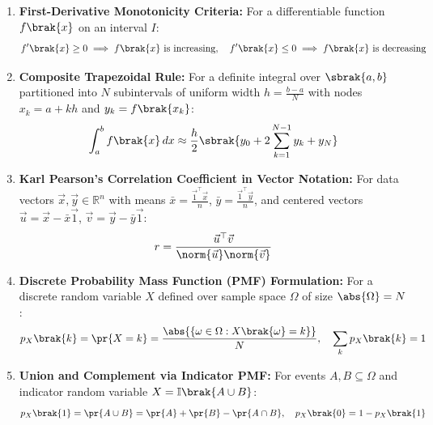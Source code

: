 \begin{enumerate}[label=\thesubsection.\arabic*, ref=\thesubsection.\theenumi]
	\item \textbf{First-Derivative Monotonicity Criteria:}
	For a differentiable function $f\brak{x}$ on an interval $I$:
	\begin{align}
		f'\brak{x} \ge 0 \implies f\brak{x} \text{ is increasing}, \quad f'\brak{x} \le 0 \implies f\brak{x} \text{ is decreasing} \label{eq:monotonicity_cond}
	\end{align}
	
	\item \textbf{Composite Trapezoidal Rule:}
	For a definite integral over $\sbrak{a, b}$ partitioned into $N$ subintervals of uniform width $h = \frac{b - a}{N}$ with nodes $x_k = a + kh$ and $y_k = f\brak{x_k}$:
	\begin{align}
		\int_{a}^{b} f\brak{x}\,dx \approx \frac{h}{2}\sbrak{y_0 + 2\sum_{k=1}^{N-1} y_k + y_N} \label{eq:trapezoidal_rule}
	\end{align}
	
	\item \textbf{Karl Pearson's Correlation Coefficient in Vector Notation:}
	For data vectors $\vec{x}, \vec{y} \in \mathbb{R}^n$ with means $\bar{x} = \frac{\vec{1}^{\top}\vec{x}}{n}$, $\bar{y} = \frac{\vec{1}^{\top}\vec{y}}{n}$, and centered vectors $\vec{u} = \vec{x} - \bar{x}\vec{1}$, $\vec{v} = \vec{y} - \bar{y}\vec{1}$:
	\begin{align}
		r = \frac{\vec{u}^{\top}\vec{v}}{\norm{\vec{u}}\norm{\vec{v}}} \label{eq:karl_pearson_vec}
	\end{align}
	
	\item \textbf{Discrete Probability Mass Function (PMF) Formulation:}
	For a discrete random variable $X$ defined over sample space $\Omega$ of size $\abs{\Omega} = N$:
	\begin{align}
		p_X\brak{k} = \pr{X = k} = \frac{\abs{\{\omega \in \Omega : X\brak{\omega} = k\}}}{N}, \quad \sum_{k} p_X\brak{k} = 1 \label{eq:pmf_prob_def}
	\end{align}
	
	\item \textbf{Union and Complement via Indicator PMF:}
	For events $A, B \subseteq \Omega$ and indicator random variable $X = \mathbb{I}\brak{A \cup B}$:
	\begin{align}
		p_X\brak{1} = \pr{A \cup B} = \pr{A} + \pr{B} - \pr{A \cap B}, \quad p_X\brak{0} = 1 - p_X\brak{1} \label{eq:pmf_union_comp}
	\end{align}
	

\end{enumerate}
